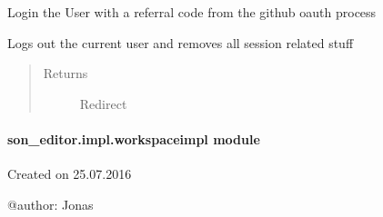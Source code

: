 \documentclass[letterpaper,10pt,english]{sphinxmanual}
\begin{document}
\begin{fulllineitems}
\label{_source/son_editor.impl:son_editor.impl.userserviceimpl.login}
Login the User with a referral code from the github oauth process

\end{fulllineitems}


\begin{fulllineitems}
\label{_source/son_editor.impl:son_editor.impl.userserviceimpl.logout}
Logs out the current user and removes all session related stuff
\begin{quote}\begin{description}
\item[{Returns}] \leavevmode
Redirect

\end{description}\end{quote}

\end{fulllineitems}


\begin{fulllineitems}
\label{_source/son_editor.impl:son_editor.impl.userserviceimpl.origin_from_referrer}
\end{fulllineitems}



\paragraph{son\_editor.impl.workspaceimpl module}
\label{_source/son_editor.impl:module-son_editor.impl.workspaceimpl}\label{_source/son_editor.impl:son-editor-impl-workspaceimpl-module}
Created on 25.07.2016

@author: Jonas

\begin{fulllineitems}
\label{_source/son_editor.impl:son_editor.impl.workspaceimpl.create_token_file}
\end{fulllineitems}
\end{document}
